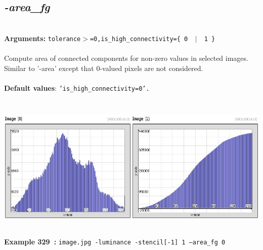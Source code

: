 \documentclass[a4paper,11pt,twoside]{book}
\begin{document}
\subsection{\emph{-area\_fg} }\vspace*{-0.5em}
~\\\textbf{Arguments: } 
{\small \texttt{tolerance$>$=0,is\_high\_connectivity=\{ 0 ~$|$~ 1 \}}}\\~\\
Compute area of connected components for non-zero values in selected images.
~\\Similar to '-area' except that 0-valued pixels are not considered.
~\\~\\\textbf{Default values}: {\small \texttt{'is\_high\_connectivity=0'.}}
\begin{center}\includegraphics[keepaspectratio=true,height=7cm,width=\textwidth]{img/gmic_def329.jpg}\\
{\footnotesize \textbf{Example 329~:} \texttt{image.jpg -luminance -stencil[-1] 1 --area\_fg 0}}
\end{center}
\end{document}
